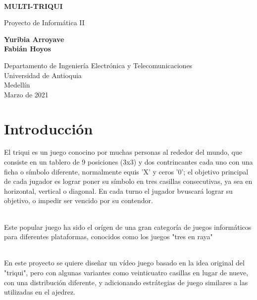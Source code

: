 ﻿﻿\documentclass{article}
\begin{document}
\begin{titlepage}
    \begin{center}
        \vspace*{1cm}
            
        \Huge
        \textbf{MULTI-TRIQUI}
            
        \vspace{0.5cm}
        \LARGE
        Proyecto de Informática II
            
        \vspace{1.5cm}
            
        \textbf{Yuribia Arroyave\\
        Fabián Hoyos}
        
    
            
        \vfill
            
        \vspace{0.8cm}
            
        \Large
        Departamento de Ingeniería Electrónica y Telecomunicaciones\\
        Universidad de Antioquia\\
        Medellín\\
        Marzo de 2021
            
    \end{center}
\end{titlepage}

\tableofcontents
\newpage
\section{Introducción}\label{intro}
El triqui es un juego conocino por muchas personas al rededor del mundo, que consiste en un tablero de 9 posiciones (3x3) y dos contrincantes cada uno con una ficha o símbolo diferente, normalmente equis 'X' y ceros '0'; el objetivo principal de cada jugador es lograr poner su símbolo en tres casillas consecutivas, ya sea en horizontal, vertical o diagonal. En cada turno el jugador bvuscará lograr su objetivo, o impedir ser vencido por su contendor.\\\

Este popular juego ha sido el orígen de una gran categoría de juegos informáticos para diferentes plataformas, conocidos como los juegos "tres en raya"\\\

En este proyecto se quiere diseñar un vídeo juego basado en la idea original del "triqui", pero con algunas variantes como veinticuatro casillas en lugar de nueve, con una distribución diferente, y adicionando estrátegias de juego similares a las utilizadas en el ajedrez.
\end{document}
